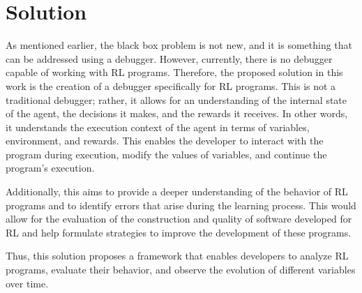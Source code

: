 
\chapter{Solution}
\label{cha:solution}

As mentioned earlier, the black box problem is not new, and it is something 
that can be addressed using a debugger. However, currently, there is no 
debugger capable of working with RL programs. Therefore, the proposed solution 
in this work is the creation of a debugger specifically for RL programs. This 
is not a traditional debugger; rather, it allows for an understanding of the 
internal state of the agent, the decisions it makes, and the rewards it 
receives. In other words, it understands the execution context of the agent 
in terms of variables, environment, and rewards. This enables the developer 
to interact with the program during execution, modify the values of variables, 
and continue the program's execution.

Additionally, this aims to provide a deeper understanding of the behavior of 
RL programs and to identify errors that arise during the learning process. 
This would allow for the evaluation of the construction and quality of 
software developed for RL and help formulate strategies to improve the 
development of these programs.

Thus, this solution proposes a framework that enables developers to 
analyze RL programs, evaluate their behavior, and observe the evolution 
of different variables over time.

\endinput

